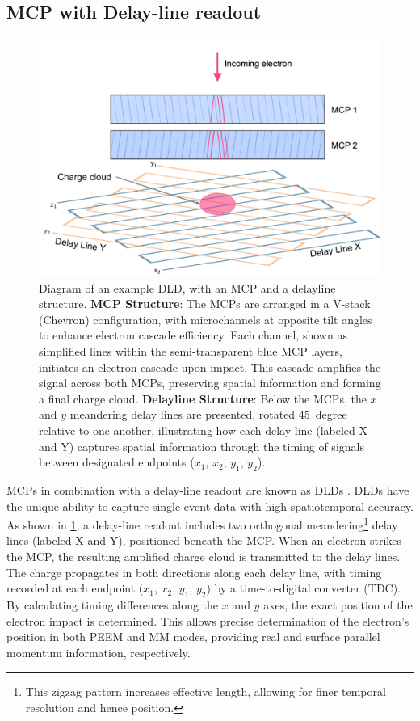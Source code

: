 \subsection*{MCP with Delay-line readout}
\begin{figure}
    \centering
    \includegraphics[width=0.9\linewidth]{images/dld.pdf}
    \caption{Diagram of an example \gls{DLD}, with an \gls{MCP} and a delayline structure. \textbf{\gls{MCP} Structure}: The \glspl{MCP} are arranged in a V-stack (Chevron) configuration, with microchannels at opposite tilt angles to enhance electron cascade efficiency. Each channel, shown as simplified lines within the semi-transparent blue \gls{MCP} layers, initiates an electron cascade upon impact. This cascade amplifies the signal across both \glspl{MCP}, preserving spatial information and forming a final charge cloud. \textbf{Delayline Structure}: Below the \glspl{MCP}, the $x$ and $y$ meandering delay lines are presented, rotated \qty{45}{degree} relative to one another, illustrating how each delay line (labeled X and Y) captures spatial information through the timing of signals between designated endpoints ($x_1$, $x_2$, $y_1$, $y_2$).}
    \label{fig:dld}
\end{figure}
\Glspl{MCP} in combination with a delay-line readout are known as \glspl{DLD} \cite{oelsnerMicrospectroscopyImagingUsing2001}. \Glspl{DLD} have the unique ability to capture single-event data with high spatiotemporal accuracy. As shown in \cref{fig:dld}, a delay-line readout includes two orthogonal meandering\footnote{This zigzag pattern increases effective length, allowing for finer temporal resolution and hence position.} delay lines (labeled X and Y), positioned beneath the MCP. When an electron strikes the \gls{MCP}, the resulting amplified charge cloud is transmitted to the delay lines. The charge propagates in both directions along each delay line, with timing recorded at each endpoint ($x_1$, $x_2$, $y_1$, $y_2$) by a time-to-digital converter (TDC). By calculating timing differences along the $x$ and $y$ axes, the exact position of the electron impact is determined. This allows precise determination of the electron's position in both \gls{PEEM} and \gls{MM} modes, providing real and surface parallel momentum information, respectively.

